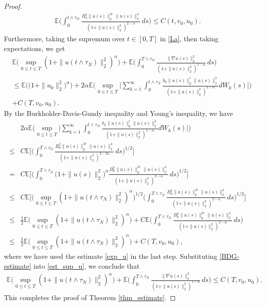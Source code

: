 \documentclass[reqno, 11pt]{amsart}
\theoremstyle{definition}
\numberwithin{equation}{section} \numberwithin{lem}{section}
\numberwithin{thm}{section} \numberwithin{prop}{section}
\numberwithin{cor}{section} \numberwithin{rem}{section}
\numberwithin{defn}{section}
\begin{document}
\begin{proof}
	\begin{align}
		\label{exp_u}
		\mathbb E\Big(\int_0^{t\wedge{\tau_N}}
		\frac{{B_0^2}\|u(s)\|_p^{2r}\|u(s)\|_2^4}
		{(1+\|u(s)\|_2^2)^{2-\alpha}}\,ds\Big)
		\le C(t,v_0,u_0).
	\end{align}
     Furthermore, taking the supremum over $t\in[0,T]$ in \eqref{La}, then taking expectations, we get
	\begin{align}
		\label{est_sup_u}
		&\mathbb E\Big(\sup_{0\le t\le T}(1+\|u(t\wedge{\tau_N})\|_2^2)^\alpha\Big)+\mathbb{E}\Big(\int_0^{T\wedge{\tau_N}}
		\frac{\|\nabla u(s)\|_2^2}{(1+\|u(s)\|_2^2)^{1-\alpha}}\,ds\Big)
		\nonumber\\
		&\le
		\mathbb E\big(\big(1+\|u_0\|_2^2\big)^\alpha\big)
		+2\alpha\mathbb E\Big(\sup_{0\le t\le T}
		\Big|
		\sum_{k=1}^\infty\int_0^{t\wedge{\tau_N}}
		\frac{b_k\|u(s)\|_p^r\|u(s)\|_2^2}{(1+\|u(s)\|_2^2)^{1-\alpha}}dW_k(s)
		\Big|\Big)
		\nonumber\\
&+C(T,v_0,u_0).
	\end{align}
	By the Burkholder-Davis-Gundy inequality and Young's inequality,  we have 
	\begin{align}
		\label{BDG-estimate}
		&2\alpha\mathbb E\Big(\sup_{0\le t\le T}
		\Big|
		\sum_{k=1}^\infty\int_0^{t\wedge{\tau_N}}
		\frac{b_k\|u(s)\|_p^r\|u(s)\|_2^2}{(1+\|u(s)\|_2^2)^{1-\alpha}}dW_k(s)
		\Big|\Big)
		\nonumber\\
		\le&
		C\mathbb E\Big[\Big(
		\int_0^{T\wedge{\tau_N}}
		\frac{{B_0^2}\|u(s)\|_p^{2r}\|u(s)\|_2^4}
		{(1+\|u(s)\|_2^2)^{2-2\alpha}}\,ds
		\Big)^{1/2}\Big]
		\nonumber\\
		=&
		C\mathbb E\Big[\Big(
		\int_0^{T\wedge{\tau_N}}
		\big(1+\|u(s)\|_2^2\big)^\alpha
		\frac{{B_0^2}\|u(s)\|_p^{2r}\|u(s)\|_2^4}
		{(1+\|u(s)\|_2^2)^{2-\alpha}}\,ds
		\Big)^{1/2}\Big]
		\nonumber\\
		\le&
		C\mathbb E\Big[
		\Big(
		\sup_{0\le t\le T}(1+\|u(t\wedge{\tau_N})\|_2^2)^\alpha
		\Big)^{1/2}
		\Big(
		\int_0^{T\wedge{\tau_N}}
		\frac{{B_0^2}\|u(s)\|_p^{2r}\|u(s)\|_2^4}
		{(1+\|u(s)\|_2^2)^{2-\alpha}}\,ds
		\Big)^{1/2}
		\Big]
		\nonumber\\
		\le&
		\frac12\mathbb E\Big(\sup_{0\le t\le T}(1+\|u(t\wedge{\tau_N})\|_2^2)^\alpha\Big)
		+C\mathbb E\Big(\int_0^{T\wedge{\tau_N}}
		\frac{{B_0^2}\|u(s)\|_p^{2r}\|u(s)\|_2^4}
		{(1+\|u(s)\|_2^2)^{2-\alpha}}\,ds\Big)
		\nonumber\\
		\le&
		\frac12\mathbb E\Big(\sup_{0\le t\le T}(1+\|u(t\wedge{\tau_N})\|_2^2)^\alpha\Big)
		+C(T,v_0,u_0),
	\end{align}
	where we have used the estimate \eqref{exp_u} in the last step.  Substituting \eqref{BDG-estimate} into \eqref{est_sup_u}, we conclude that
	\begin{align}
	    \mathbb E\Big(\sup_{0\le t\le T}(1+\|u(t\wedge\tau_N)\|_2^2)^\alpha\Big)+\mathbb{E}\Big(\int_0^{T\wedge{\tau_N}}
		\frac{\|\nabla u(s)\|_2^2}{(1+\|u(s)\|_2^2)^{1-\alpha}}\,ds\Big)
	\le C(T,v_0,u_0).
	\end{align}
    This completes the proof of Theorem \ref{thm_estimate}.
     \end{proof}
\end{document}
